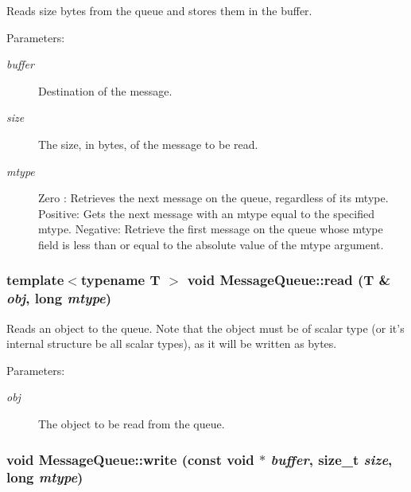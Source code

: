Reads size bytes from the queue and stores them in the buffer.

\begin{Desc}
\item[Parameters:]
\begin{description}
\item[{\em buffer}]Destination of the message. \item[{\em size}]The size, in bytes, of the message to be read. \item[{\em mtype}]Zero : Retrieves the next message on the queue, regardless of its mtype. Positive: Gets the next message with an mtype equal to the specified mtype. Negative: Retrieve the first message on the queue whose mtype field is less than or equal to the absolute value of the mtype argument. \end{description}
\end{Desc}
\hypertarget{classMessageQueue_81d59fbb3d8ad809a37e0f9a56a90fc6}{
\subsubsection[{read}]{\setlength{\rightskip}{0pt plus 5cm}template$<$typename T $>$ void MessageQueue::read (T \& {\em obj}, \/  long {\em mtype})}}
\label{classMessageQueue_81d59fbb3d8ad809a37e0f9a56a90fc6}


Reads an object to the queue. Note that the object must be of scalar type (or it's internal structure be all scalar types), as it will be written as bytes.

\begin{Desc}
\item[Parameters:]
\begin{description}
\item[{\em obj}]The object to be read from the queue. \end{description}
\end{Desc}
\hypertarget{classMessageQueue_b0a94ebdfdd9163fce40657e2fbfd891}{
\subsubsection[{write}]{\setlength{\rightskip}{0pt plus 5cm}void MessageQueue::write (const void $\ast$ {\em buffer}, \/  size\_\-t {\em size}, \/  long {\em mtype})}}
\label{classMessageQueue_b0a94ebdfdd9163fce40657e2fbfd891}


